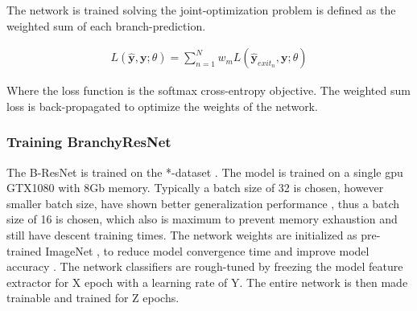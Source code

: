 The network is trained solving the joint-optimization problem is defined as the weighted sum of each branch-prediction.

\begin{align*}
	L(\hat{\mathbf{y}},\mathbf{y};\theta) = \sum_{n=1}^{N} w_m L(\hat{\mathbf{y}}_{exit_n},\mathbf{y};\theta)
\end{align*}

Where the loss function is the softmax cross-entropy objective.
The weighted sum loss is back-propagated to optimize the weights of the network. 

\subsubsection{Training BranchyResNet}

The B-ResNet is trained on the *-dataset \cite{dataset}. The model is trained on a single \gls{gpu} GTX1080 with 8Gb memory. Typically a batch size of 32 is chosen, however smaller batch size, have shown better generalization performance \cite{masters_revisiting_nodate}, thus a batch size of 16 is chosen, which also is maximum to prevent memory exhaustion and still have descent training times. The network weights are initialized as pre-trained ImageNet \cite{deng_imagenet:_2009}, to reduce model convergence time and improve model accuracy \cite{yosinski_how_2014}. The network classifiers are rough-tuned by freezing the model feature extractor for X epoch with a learning rate of Y. The entire network is then made trainable and trained for Z epochs.

